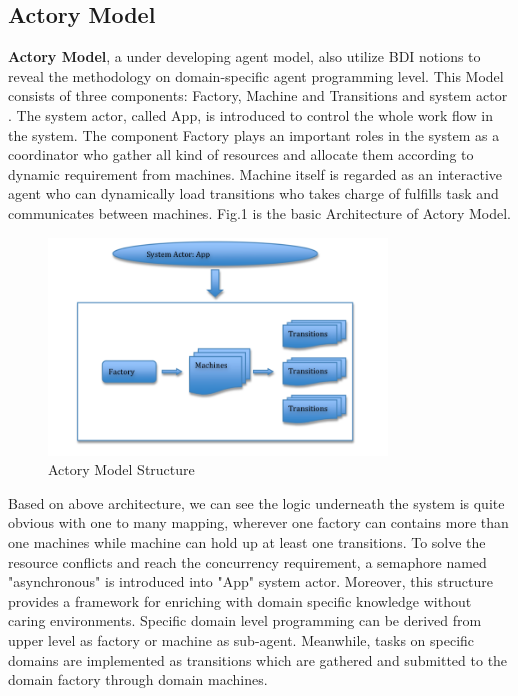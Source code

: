\documentclass{sig-alternate}
\begin{document}
\subsection{Actory Model}
 \textbf{ Actory Model}, a under developing agent model, also utilize BDI notions to reveal the methodology on domain-specific agent programming level.  This Model consists of three components: Factory, Machine and Transitions and system actor \cite{Levesque94golog:a}. 
 The system actor, called App, is introduced to control the whole work flow in the system. The component Factory plays an important roles in the system as a coordinator who gather all kind of resources and allocate them according to dynamic requirement from machines. Machine itself is regarded as an interactive agent who can dynamically load transitions who takes charge of fulfills task and communicates between machines.  Fig.1 is the basic Architecture of Actory Model. \\

\begin{figure}[h]
\centering
\includegraphics[width=90mm ]{actorymodel.png}
\caption{Actory Model Structure}
\end{figure}

Based on above architecture, we can see the logic underneath the system is quite obvious with one to many mapping, wherever one factory can contains more than one machines while machine can hold up at least one transitions.  To solve the resource conflicts and reach the concurrency requirement, a semaphore named "asynchronous" is introduced into "App" system actor.  Moreover, this structure provides a framework for enriching with domain specific knowledge without caring environments. Specific domain level programming can be derived from upper level as factory or machine as sub-agent. Meanwhile, tasks on specific domains are implemented as transitions which are gathered and submitted to the domain factory through domain machines. 
\end{document}
